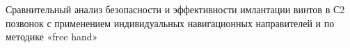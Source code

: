 
Сравнительный анализ безопасности и эффективности имлантации винтов в
С2 позвонок с применением индивидуальных навигационных направителей и по
методике «free hand» 
